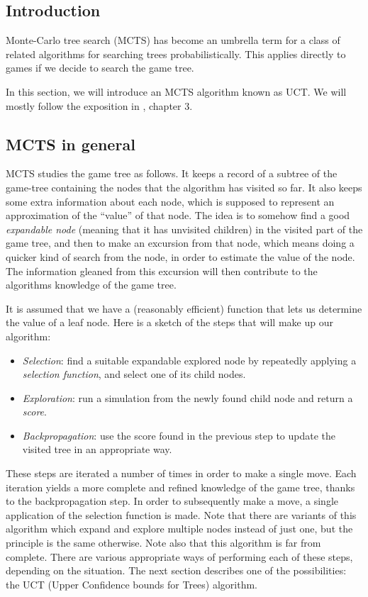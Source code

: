 \subsection {Introduction}

Monte-Carlo tree search (MCTS) has become an umbrella term for a class of related algorithms for searching trees probabilistically.
This applies directly to games if we decide to search the game tree.

In this section, we will introduce an MCTS algorithm known as UCT.
We will mostly follow the exposition in \citep{mcts_survey12}, chapter 3.

\subsection {MCTS in general}

MCTS studies the game tree as follows.
It keeps a record of a subtree of the game-tree containing the nodes that the algorithm has visited so far.
It also keeps some extra information about each node, which is supposed to represent an approximation of the ``value'' of that node.
The idea is to somehow find a good \emph{expandable node} (meaning that it has unvisited children) in the visited part of the game tree, and then to make an excursion from that node, which means doing a quicker kind of search from the node, in order to estimate the value of the node. The information gleaned from this excursion will then contribute to the algorithms knowledge of the game tree.

It is assumed that we have a (reasonably efficient) function that lets us determine the value of a leaf node.
Here is a sketch of the steps that will make up our algorithm:

\begin{itemize}
\item \emph{Selection}: find a suitable expandable explored node by repeatedly applying a \emph{selection function}, and select one of its child nodes.
\item \emph{Exploration}: run a simulation from the newly found child node and return a \emph{score}.
\item \emph{Backpropagation}: use the score found in the previous step to update the visited tree in an appropriate way.
\end{itemize}
These steps are iterated a number of times in order to make a single move. Each iteration yields a more complete and refined knowledge of the game tree, thanks to the backpropagation step. In order to subsequently make a move, a single application of the selection function is made.
Note that there are variants of this algorithm which expand and explore multiple nodes instead of just one, but the principle is the same otherwise.
Note also that this algorithm is far from complete. There are various appropriate ways of performing each of these steps, depending on the situation.
The next section describes one of the possibilities: the UCT (Upper Confidence bounds for Trees) algorithm.

